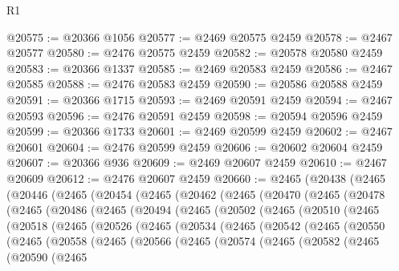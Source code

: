 \begin{lexlean}{R1}
\begin{coremodule}
@20575 := @20366 @1056
@20577 := @2469 @20575 @2459
@20578 := @2467 @20577
@20580 := @2476 @20575 @2459
@20582 := @20578 @20580 @2459
@20583 := @20366 @1337
@20585 := @2469 @20583 @2459
@20586 := @2467 @20585
@20588 := @2476 @20583 @2459
@20590 := @20586 @20588 @2459
@20591 := @20366 @1715
@20593 := @2469 @20591 @2459
@20594 := @2467 @20593
@20596 := @2476 @20591 @2459
@20598 := @20594 @20596 @2459
@20599 := @20366 @1733
@20601 := @2469 @20599 @2459
@20602 := @2467 @20601
@20604 := @2476 @20599 @2459
@20606 := @20602 @20604 @2459
@20607 := @20366 @936
@20609 := @2469 @20607 @2459
@20610 := @2467 @20609
@20612 := @2476 @20607 @2459
@20660 := @2465
    (@20438
      (@2465
        (@20446
          (@2465
            (@20454
              (@2465
                (@20462
                  (@2465
                    (@20470
                      (@2465
                        (@20478
                          (@2465
                            (@20486
                              (@2465
                                (@20494
                                  (@2465
                                    (@20502
                                      (@2465
                                        (@20510
                                          (@2465
                                            (@20518
                                              (@2465
                                                (@20526
                                                  (@2465
                                                    (@20534
                                                      (@2465
                                                        (@20542
                                                          (@2465
                                                            (@20550
                                                              (@2465
                                                                (@20558
                                                                  (@2465
                                                                    (@20566
                                                                      (@2465
                                                                        (@20574
                                                                          (@2465
                                                                            (@20582
                                                                              (@2465
                                                                                (@20590
                                                                                  (@2465

\end{coremodule}
\end{lexlean}
